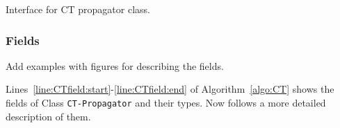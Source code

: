 \documentclass[a4paper,11pt]{article}
\newcommand{\Todo}[1]{{\color{blue}#1}}
\newcommand{\Algoref}[1]{Algorithm~\ref{#1}}
\newcommand{\Linesref}[2]{Lines~\ref{#1}-\ref{#2}}
\newcommand{\SparseBitSet}{\texttt{SparseBitSet}}
\numberwithin{equation}{section}
\begin{document}
 \begin{algorithm}[H]
  \begin{algorithmic}[1]  %
    
    \end{algorithmic}
  \caption{Interface for CT propagator class.}
  \label{algo:CT}
\end{algorithm}





\subsubsection{Fields}
\label{CT:fields}

\Todo{Add examples with figures for describing the fields.}

\Linesref{line:CTfield:start}{line:CTfield:end} of \Algoref{algo:CT}
shows the fields of Class \texttt{CT-Propagator} and their types.
Now follows a more detailed
description of them.
\end{document}
